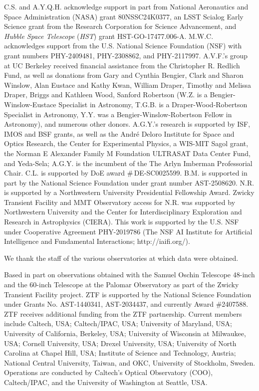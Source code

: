 \documentclass[twocolumn,twocolappendix, linenumbers, trackchanges]{aastex7}
\begin{document}
C.S. and A.Y.Q.H. acknowledge support in part from National Aeronautics and Space Administration (NASA) grant 80NSSC24K0377, an LSST Scialog Early Science grant from the Research Corporation for Science Advancement, and {\it Hubble Space Telescope} ({\it HST}) grant HST-GO-17477.006-A. 
M.W.C. acknowledges support from the U.S. National Science Foundation (NSF) with grant numbers PHY-2409481, PHY-2308862, and PHY-2117997.
A.V.F.'s group at UC Berkeley received financial assistance from the Christopher R. Redlich Fund, as well as donations from Gary and    
Cynthia Bengier, Clark and Sharon Winslow, Alan Eustace and Kathy Kwan, William Draper, Timothy and Melissa Draper, Briggs and Kathleen Wood, Sanford Robertson (W.Z. is a Bengier-Winslow-Eustace Specialist in Astronomy, T.G.B. is a Draper-Wood-Robertson Specialist in Astronomy, Y.Y. was a Bengier-Winslow-Robertson Fellow in Astronomy), and numerous other donors.  
A.G.Y.'s research is supported by ISF, IMOS and BSF grants, as well as the André Deloro Institute for Space and Optics Research, the Center for Experimental Physics, a WIS-MIT Sagol grant, the Norman E Alexander Family M Foundation ULTRASAT Data Center Fund, and Yeda-Sela;  A.G.Y. is the incumbent of the The Arlyn Imberman Professorial Chair.
C.L. is supported by DoE award \#\,DE-SC0025599.
B.M. is supported in part by the National Science Foundation under grant number AST-2508620.
N.R. is supported by a Northwestern University Presidential Fellowship Award. Zwicky Transient Facility and MMT Observatory access for N.R. was supported by Northwestern University and the Center for Interdisciplinary Exploration and Research in Astrophysics (CIERA).
This work is supported by the U.S. NSF 
under Cooperative Agreement PHY-2019786 (The NSF AI Institute for Artificial Intelligence and Fundamental Interactions; http://iaifi.org/).

We thank the staff of the various observatories at which data were obtained.

Based in part on observations obtained with the Samuel Oschin Telescope 48-inch and the 60-inch
Telescope at the Palomar Observatory as part of the Zwicky Transient Facility project. ZTF is
supported by the National Science Foundation under Grants No. AST-1440341, AST-2034437, and
currently Award \#2407588. ZTF receives additional funding from the ZTF partnership. Current
members include Caltech, USA; Caltech/IPAC, USA; University of Maryland, USA; University of
California, Berkeley, USA; University of Wisconsin at Milwaukee, USA; Cornell University, USA;
Drexel University, USA; University of North Carolina at Chapel Hill, USA; Institute of Science and
Technology, Austria; National Central University, Taiwan, and OKC, University of Stockholm,
Sweden. Operations are conducted by Caltech's Optical Observatory (COO), Caltech/IPAC, and the
University of Washington at Seattle, USA.
\end{document}

